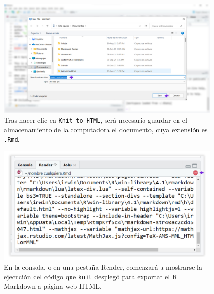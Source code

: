 \documentclass[
]{article}
\theoremstyle{definition}
\theoremstyle{definition}
\theoremstyle{definition}
\theoremstyle{definition}
\theoremstyle{remark}
\begin{document}
\begin{figure}

{\centering \includegraphics[width=1\linewidth]{figs/screenshots/abrir R Markdown 5} 

}

\caption{Tras hacer clic en \texttt{Knit\ to\ HTML}, será necesario guardar en el almacenamiento de la computadora el documento, cuya extensión es \texttt{.Rmd}.}\label{fig:figura27}
\end{figure}



\begin{figure}

{\centering \includegraphics[width=1\linewidth]{figs/screenshots/abrir R Markdown 6} 

}

\caption{En la consola, o en una pestaña Render, comenzará a mostrarse la ejecución del código que \texttt{knit} desplegó para exportar el R Markdown a página web HTML.}\label{fig:figura28}
\end{figure}
\end{document}
